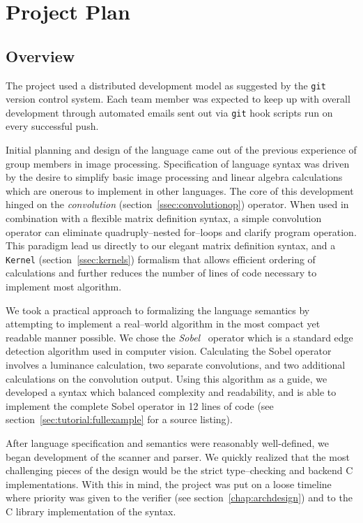 \chapter{Project Plan}

\section{Overview}
The \sys{} project used a distributed development model as suggested by the
\texttt{git}~\cite{git:website} version control system. Each team member was expected
to keep up with overall development through automated emails sent out via \texttt{git}
hook scripts run on every successful push.

Initial planning and design of the \sys{} language came out of the previous experience of
group members in image processing. Specification of language syntax was driven by the desire
to simplify basic image processing and linear algebra calculations which are onerous to
implement in other languages. The core of this development hinged on the \emph{convolution}
(section~\ref{ssec:convolutionop}) operator. When used in combination with a flexible matrix
definition syntax, a simple convolution operator can eliminate quadruply--nested for--loops and
clarify program operation. This paradigm lead us directly to our elegant matrix definition
syntax, and a \texttt{Kernel} (section~\ref{ssec:kernels}) formalism that allows efficient
ordering of calculations and further reduces the number of lines of code necessary to implement
most algorithm.

We took a practical approach to formalizing the language semantics by attempting to implement
a real--world algorithm in the most compact yet readable manner possible. We chose
the \emph{Sobel}~\cite{sobel:wikipedia} operator which is a standard edge detection algorithm
used in computer vision. Calculating the Sobel operator involves a luminance calculation,
two separate convolutions, and two additional calculations on the convolution output. Using
this algorithm as a guide, we developed a syntax which balanced complexity and readability,
and is able to implement the complete Sobel operator in 12 lines of code
(see section~\ref{sec:tutorial:fullexample} for a source listing).

After language specification and semantics were reasonably well-defined, we began development
of the scanner and parser. We quickly realized that the most challenging pieces of the \sys{}
design would be the strict type--checking and backend C implementations. With this in mind,
the project was put on a loose timeline where priority was given to the verifier
(see section~\ref{chap:archdesign}) and to the C library implementation of the \sys{} syntax.

